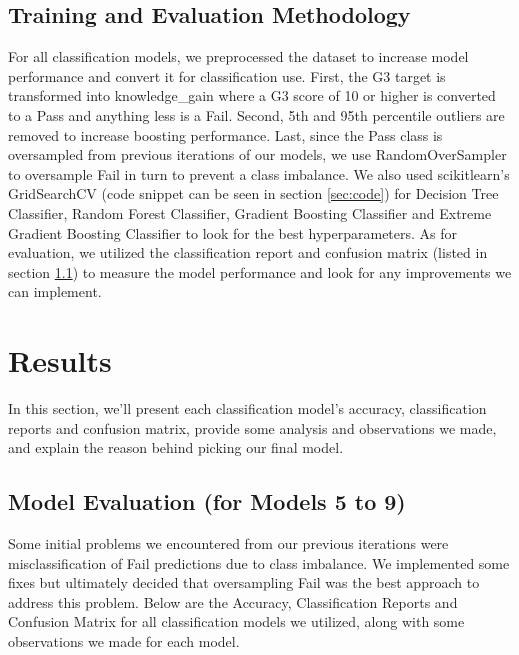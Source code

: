 \documentclass[11pt,a4paper]{article}
\begin{document}
\subsection{Training and Evaluation Methodology}
For all classification models, we preprocessed the dataset to increase model performance and convert it for classification use. First, the G3 target is transformed into knowledge\_gain where a G3 score of 10 or higher is converted to a Pass and anything less is a Fail. Second, 5th and 95th percentile outliers are removed to increase boosting performance. Last, since the Pass class is oversampled from previous iterations of our models, we use RandomOverSampler to oversample Fail in turn to prevent a class imbalance. We also used scikitlearn's GridSearchCV (code snippet can be seen in section \ref{sec:code}) for Decision Tree Classifier, Random Forest Classifier, Gradient Boosting Classifier and Extreme Gradient Boosting Classifier to look for the best hyperparameters. As for evaluation, we utilized the classification report and confusion matrix (listed in section \ref{subsec:modeleval}) to measure the model performance and look for any improvements we can implement.

\section{Results}
\label{sec:results}
In this section, we'll present each classification model's accuracy, classification reports and confusion matrix, provide some analysis and observations we made, and explain the reason behind picking our final model.

\subsection{Model Evaluation (for Models 5 to 9)}
\label{subsec:modeleval}
Some initial problems we encountered from our previous iterations were misclassification of Fail predictions due to class imbalance. We implemented some fixes but ultimately decided that oversampling Fail was the best approach to address this problem. Below are the Accuracy, Classification Reports and Confusion Matrix for all classification models we utilized, along with some observations we made for each model.
\end{document}
